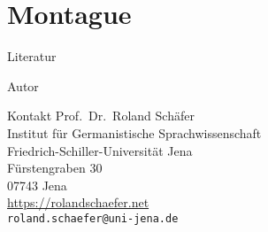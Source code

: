 \documentclass[handout,aspectratio=1610,dvipsnames]{beamer}
\begin{document}
  \section[Montagues intentionale Logik]{Montague}
  \let\woopsi\section\let\section\subsection\let\subsection\subsubsection
  
  \let\subsection\section\let\section\woopsi

\fi


\makeatletter
\setcounter{lastpagemainpart}{\the\c@framenumber}
\makeatother

\appendix

\begin{frame}[allowframebreaks]
  {Literatur}
  \renewcommand*{\bibfont}{\footnotesize}
  \printbibliography
\end{frame}

\begin{frame}
  {Autor}
  \begin{block}{Kontakt}
    Prof.\ Dr.\ Roland Schäfer\\
    Institut für Germanistische Sprachwissenschaft\\
    Friedrich-Schiller-Universität Jena\\
    Fürstengraben 30\\
    07743 Jena\\[\baselineskip]
    \url{https://rolandschaefer.net}\\
    \texttt{roland.schaefer@uni-jena.de}
  \end{block}
\end{frame}
\end{document}
